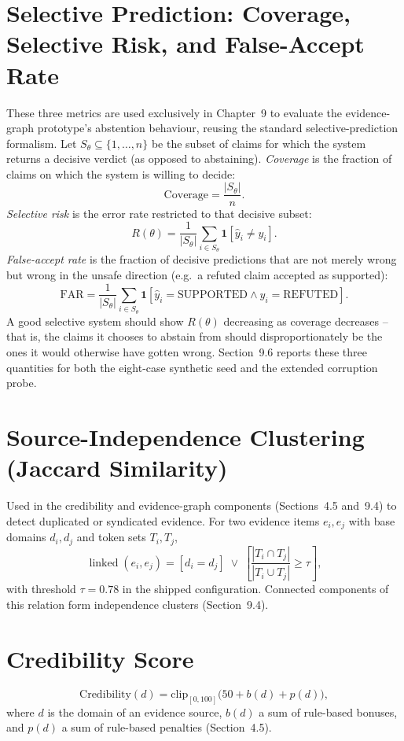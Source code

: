 \documentclass[12pt,a4paper,openany]{report}
\begin{document}
\section{Selective Prediction: Coverage, Selective Risk, and False-Accept Rate}
\label{sec:selective-defs}
These three metrics are used exclusively in Chapter~9 to evaluate the evidence-graph prototype's abstention behaviour, reusing the standard selective-prediction formalism. Let $S_\theta \subseteq \{1,\ldots,n\}$ be the subset of claims for which the system returns a decisive verdict (as opposed to abstaining). \emph{Coverage} is the fraction of claims on which the system is willing to decide:
\[
\mathrm{Coverage} = \frac{|S_\theta|}{n}.
\]
\emph{Selective risk} is the error rate restricted to that decisive subset:
\[
R(\theta) = \frac{1}{|S_\theta|}\sum_{i \in S_\theta} \mathbf{1}[\hat y_i \ne y_i].
\]
\emph{False-accept rate} is the fraction of decisive predictions that are not merely wrong but wrong in the unsafe direction (e.g.\ a refuted claim accepted as supported):
\[
\mathrm{FAR} = \frac{1}{|S_\theta|}\sum_{i \in S_\theta} \mathbf{1}[\hat y_i = \mathrm{SUPPORTED} \wedge y_i = \mathrm{REFUTED}].
\]
A good selective system should show $R(\theta)$ decreasing as coverage decreases -- that is, the claims it chooses to abstain from should disproportionately be the ones it would otherwise have gotten wrong. Section~9.6 reports these three quantities for both the eight-case synthetic seed and the extended corruption probe.

\section{Source-Independence Clustering (Jaccard Similarity)}
\label{sec:jaccard-def}
Used in the credibility and evidence-graph components (Sections~4.5 and~9.4) to detect duplicated or syndicated evidence. For two evidence items $e_i, e_j$ with base domains $d_i, d_j$ and token sets $T_i, T_j$,
\[
\operatorname{linked}(e_i,e_j) = [d_i = d_j] \;\lor\; \left[\frac{|T_i \cap T_j|}{|T_i \cup T_j|} \ge \tau\right],
\]
with threshold $\tau = 0.78$ in the shipped configuration. Connected components of this relation form independence clusters (Section~9.4).

\section{Credibility Score}
\label{sec:cred-def}
\[
\mathrm{Credibility}(d) = \mathrm{clip}_{[0,100]}\big(50 + b(d) + p(d)\big),
\]
where $d$ is the domain of an evidence source, $b(d)$ a sum of rule-based bonuses, and $p(d)$ a sum of rule-based penalties (Section~4.5).
\end{document}
